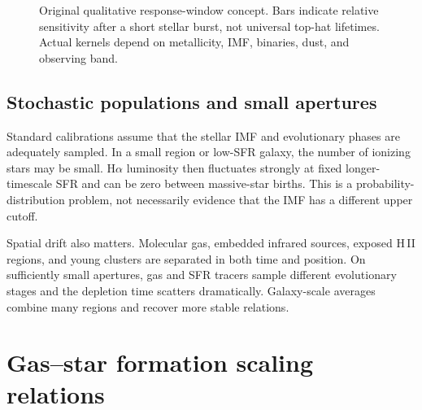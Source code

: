 \begin{figure}[tbp]
\centering
{}
\caption{Original qualitative response-window concept.  Bars indicate relative
sensitivity after a short stellar burst, not universal top-hat lifetimes.  Actual
kernels depend on metallicity, IMF, binaries, dust, and observing band.}
\label{fig:sfr-response-windows}
\end{figure}

\subsection{Stochastic populations and small apertures}

Standard calibrations assume that the stellar IMF and evolutionary phases are
adequately sampled.  In a small region or low-SFR galaxy, the number of ionizing stars
may be small.  H$\alpha$ luminosity then fluctuates strongly at fixed longer-timescale
SFR and can be zero between massive-star births.  This is a probability-distribution
problem, not necessarily evidence that the IMF has a different upper cutoff.

Spatial drift also matters.  Molecular gas, embedded infrared sources, exposed H\,II
regions, and young clusters are separated in both time and position.  On sufficiently
small apertures, gas and SFR tracers sample different evolutionary stages and the
depletion time scatters dramatically.  Galaxy-scale averages combine many regions and
recover more stable relations.

\section{Gas--star formation scaling relations}

